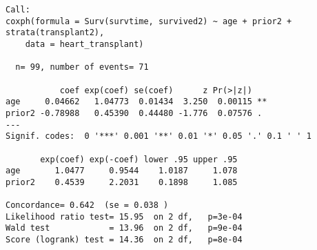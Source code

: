 \documentclass[
  letterpaper,
  DIV=11,
  numbers=noendperiod]{scrreprt}
\newenvironment{Shaded}{\begin{snugshade}}{\end{snugshade}}
\newcommand{\AttributeTok}[1]{\textcolor[rgb]{0.40,0.45,0.13}{#1}}
\newcommand{\CommentTok}[1]{\textcolor[rgb]{0.37,0.37,0.37}{#1}}
\newcommand{\DecValTok}[1]{\textcolor[rgb]{0.68,0.00,0.00}{#1}}
\newcommand{\FunctionTok}[1]{\textcolor[rgb]{0.28,0.35,0.67}{#1}}
\newcommand{\NormalTok}[1]{\textcolor[rgb]{0.00,0.23,0.31}{#1}}
\newcommand{\OtherTok}[1]{\textcolor[rgb]{0.00,0.23,0.31}{#1}}
\newcommand{\SpecialCharTok}[1]{\textcolor[rgb]{0.37,0.37,0.37}{#1}}
\newcommand{\StringTok}[1]{\textcolor[rgb]{0.13,0.47,0.30}{#1}}
\begin{document}
\begin{Shaded}
\end{Shaded}

\begin{verbatim}
Call:
coxph(formula = Surv(survtime, survived2) ~ age + prior2 + strata(transplant2), 
    data = heart_transplant)

  n= 99, number of events= 71 

           coef exp(coef) se(coef)      z Pr(>|z|)   
age     0.04662   1.04773  0.01434  3.250  0.00115 **
prior2 -0.78988   0.45390  0.44480 -1.776  0.07576 . 
---
Signif. codes:  0 '***' 0.001 '**' 0.01 '*' 0.05 '.' 0.1 ' ' 1

       exp(coef) exp(-coef) lower .95 upper .95
age       1.0477     0.9544    1.0187     1.078
prior2    0.4539     2.2031    0.1898     1.085

Concordance= 0.642  (se = 0.038 )
Likelihood ratio test= 15.95  on 2 df,   p=3e-04
Wald test            = 13.96  on 2 df,   p=9e-04
Score (logrank) test = 14.36  on 2 df,   p=8e-04
\end{verbatim}
\end{document}
